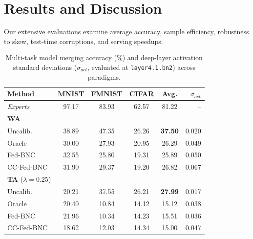 \documentclass{article}
\theoremstyle{plain}
\theoremstyle{definition}
\theoremstyle{remark}
\begin{document}
\section{Results and Discussion}
\label{sec:results}

Our extensive evaluations examine average accuracy, sample efficiency, robustness to skew, test-time corruptions, and serving speedups.

\begin{table}[t]
\caption{Multi-task model merging accuracy ($\%$) and deep-layer activation standard deviations ($\sigma_{act}$, evaluated at \texttt{layer4.1.bn2}) across paradigms.}
\label{tab:main_results}
\vskip 0.08in
\begin{center}
\begin{footnotesize}
\begin{sc}
\setlength{\tabcolsep}{2.5pt}
\begin{tabular}{lccccr}
\toprule
Method & MNIST & FMNIST & CIFAR & Avg. & $\sigma_{act}$ \\
\midrule
\textit{Experts} & 97.17 & 83.93 & 62.57 & 81.22 & -- \\
\midrule
\textbf{WA} & & & & & \\
Uncalib. & 38.89 & 47.35 & 26.26 & \textbf{37.50} & 0.020 \\
Oracle & 30.00 & 27.93 & 20.95 & 26.29 & 0.049 \\
Fed-BNC & 32.55 & 25.80 & 19.31 & 25.89 & 0.050 \\
CC-Fed-BNC & 31.90 & 29.37 & 19.20 & 26.82 & 0.067 \\
\midrule
\textbf{TA} ($\lambda=0.25$) & & & & & \\
Uncalib. & 20.21 & 37.55 & 26.21 & \textbf{27.99} & 0.017 \\
Oracle & 20.40 & 10.84 & 14.12 & 15.12 & 0.038 \\
Fed-BNC & 21.96 & 10.34 & 14.23 & 15.51 & 0.036 \\
CC-Fed-BNC & 18.62 & 12.03 & 14.34 & 15.00 & 0.047 \\
\bottomrule
\end{tabular}
\end{sc}
\end{footnotesize}
\end{center}
\vskip -0.1in
\end{table}
\end{document}
